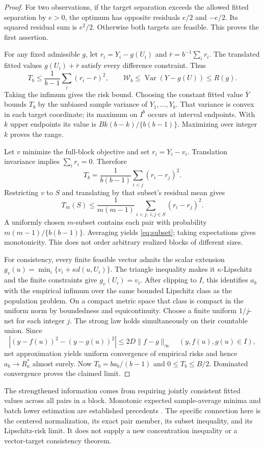 \begin{proof}
For two observations, if the target separation exceeds the allowed fitted
separation by $e>0$, the optimum has opposite residuals $e/2$ and $-e/2$.
Its squared residual sum is $e^2/2$. Otherwise both targets are feasible.
This proves the first assertion.

For any fixed admissible $g$, let $r_i=Y_i-g(U_i)$ and
$\bar r=b^{-1}\sum_i r_i$. The translated fitted values
$g(U_i)+\bar r$ satisfy every difference constraint. Thus
\[
 T_b\leq\frac1{b-1}\sum_i(r_i-\bar r)^2,
 \qquad \mathcal W_b\leq\operatorname{Var}(Y-g(U))\leq R(g).
\]
Taking the infimum gives the risk bound. Choosing the constant fitted value
$\bar Y$ bounds $T_b$ by the unbiased sample variance of $Y_1,\ldots,Y_b$.
That variance is convex in each target coordinate; its maximum on $I^b$
occurs at interval endpoints. With $k$ upper endpoints its value is
$B k(b-k)/\{b(b-1)\}$. Maximizing over integer $k$ proves the range.

Let $v$ minimize the full-block objective and set $r_i=Y_i-v_i$.
Translation invariance implies $\sum_i r_i=0$. Therefore
\[
 T_b=\frac1{b(b-1)}\sum_{i<j}(r_i-r_j)^2.
\]
Restricting $v$ to $S$ and translating by that subset's residual mean gives
\[
 T_m(S)\leq\frac1{m(m-1)}
              \sum_{i<j,\ i,j\in S}(r_i-r_j)^2.
\]
A uniformly chosen $m$-subset contains each pair with probability
$m(m-1)/\{b(b-1)\}$. Averaging yields \eqref{eq:subset}; taking
expectations gives monotonicity. This does not order arbitrary realized
blocks of different sizes.

For consistency, every finite feasible vector admits the scalar extension
$g_v(u)=\min_i\{v_i+\kappa d(u,U_i)\}$. The triangle inequality makes it
$\kappa$-Lipschitz and the finite constraints give $g_v(U_i)=v_i$.
After clipping to $I$, this identifies $a_b$ with the empirical infimum over
the same bounded Lipschitz class as the population problem. On a compact
metric space that class is compact in the uniform norm by boundedness and
equicontinuity. Choose a finite uniform $1/j$-net for each integer $j$.
The strong law holds simultaneously on their countable union. Since
\[
 |(y-f(u))^2-(y-g(u))^2|\leq2D\|f-g\|_\infty
 \quad(y,f(u),g(u)\in I),
\]
net approximation yields uniform convergence of empirical risks and hence
$a_b\to R^*_\kappa$ almost surely. Now $T_b=b a_b/(b-1)$ and
$0\leq T_b\leq B/2$. Dominated convergence proves the claimed limit.
\end{proof}

The strengthened information comes from requiring jointly consistent fitted
values across all pairs in a block. Monotonic expected sample-average
minima and batch lower estimation are established precedents
\citep{mak1999montecarlo,linderoth2006empirical}. The specific connection
here is the centered normalization, its exact pair member, its subset
inequality, and its Lipschitz-risk limit. It does not supply a new
concentration inequality or a vector-target consistency theorem.

